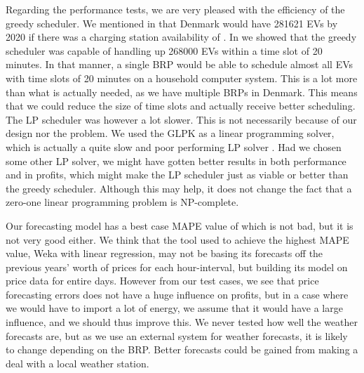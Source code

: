 Regarding the performance tests, we are very pleased with the efficiency of the greedy scheduler. We mentioned in  that Denmark would have \num{281621} EVs by 2020 if there was a charging station availability of . In  we showed that the greedy scheduler was capable of handling up \num{268000} EVs within a time slot of 20 minutes. In that manner, a single BRP would be able to schedule almost all EVs with time slots of 20 minutes on a household computer system. This is a lot more than what is actually needed, as we have multiple BRPs in Denmark. This means that we could reduce the size of time slots and actually receive better scheduling. The LP scheduler was however a lot slower. This is not necessarily because of our design nor the problem. We used the GLPK as a linear programming solver, which is actually a quite slow and poor performing LP solver \cite{LPBENCHMARK}. Had we chosen some other LP solver, we might have gotten better results in both performance and in profits, which might make the LP scheduler just as viable or better than the greedy scheduler. Although this may help, it does not change the fact that a zero-one linear programming problem is NP-complete.

Our forecasting model has a best case MAPE value of  which is not bad, but it is not very good either. We think that the tool used to achieve the highest MAPE value, Weka with linear regression, may not be basing its forecasts off the previous years' worth of prices for each hour-interval, but building its model on price data for entire days. However from our test cases, we see that price forecasting errors does not have a huge influence on profits, but in a case where we would have to import a lot of energy, we assume that it would have a large influence, and we should thus improve this. We never tested how well the weather forecasts are, but as we use an external system for weather forecasts, it is likely to change depending on the BRP. Better forecasts could be gained from making a deal with a local weather station.

